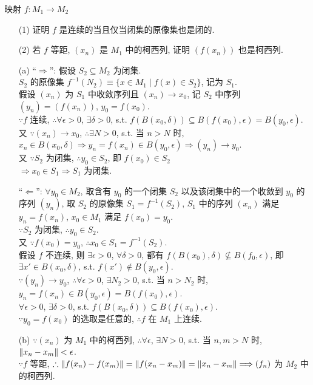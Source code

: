 \documentclass{assignment}
\begin{document}
\begin{prob}
    映射 $f:M_1\rightarrow M_2$
    \begin{itemize}
        \item[(1)] 证明 $f$ 是连续的当且仅当闭集的原像集也是闭的.
        \item[(2)] 若 $f$ 等距, $(x_n)$ 是 $M_1$ 中的柯西列, 证明 $(f(x_n))$ 也是柯西列.
    \end{itemize}
\end{prob}
\begin{sol}
    \begin{itemize}
        \item[(a)] ``$\Longrightarrow$'': 假设 $S_2\subseteq M_2$ 为闭集.\\
        $S_2$ 的原像集 $f^{-1}(N_2)\equiv\{x\in M_1\mid f(x)\in S_2\}$, 记为 $S_1$.\\
        假设 $(x_n)$ 为 $S_1$ 中收敛序列且 $(x_n)\rightarrow x_0$, 记 $S_2$ 中序列 $(y_n)=(f(x_n))$, $y_0=f(x_0)$.\\
        $\because f$ 连续, $\therefore\forall\epsilon>0$, $\exists\delta>0$, s.t. $f(B(x_0,\delta))\subseteq B(f(x_0),\epsilon)=B(y_0,\epsilon)$.\\
        又 $\because(x_n)\rightarrow x_0$, $\therefore\exists N>0$, s.t. 当 $n>N$ 时, $x_n\in B(x_0,\delta)\Longrightarrow y_n=f(x_n)\in B(y_0,\epsilon)\Longrightarrow(y_n)\rightarrow y_0$.\\
        又 $\because S_2$ 为闭集, $\therefore y_0\in S_2$, 即 $f(x_0)\in S_2$\\
        $\Longrightarrow x_0\in S_1\Longrightarrow S_1$ 为闭集.

        ``$\Longleftarrow$'': $\forall y_0\in M_2$, 取含有 $y_0$ 的一个闭集 $S_2$ 以及该闭集中的一个收敛到 $y_0$ 的序列 $(y_n)$, 取 $S_2$ 的原像集 $S_1=f^{-1}(S_2)$, $S_1$ 中的序列 $(x_n)$ 满足 $y_n=f(x_n)$, $x_0\in M_1$ 满足 $f(x_0)=y_0$.\\
        $\because S_2$ 为闭集, $\therefore y_0\in S_2$.\\
        又 $\because f(x_0)=y_0$, $\therefore x_0\in S_1=f^{-1}(S_2)$.\\

        假设 $f$ 不连续, 则 $\exists\epsilon>0$, $\forall\delta>0$, 都有 $f(B(x_0),\delta)\nsubseteq B(f_0,\epsilon)$, 即 $\exists x'\in B(x_0,\delta)$, s.t. $f(x')\notin B(y_0,\epsilon)$.\\
        $\because(y_n)\rightarrow y_0$, $\therefore\forall\epsilon>0$, $\exists N_2>0$, s.t. 当 $n>N_2$ 时, $y_n=f(x_n)\in B(y_0,\epsilon)=B(f(x_0),\epsilon)$.\\
        $\forall\epsilon>0$, $\exists\delta>0$, s.t. $f(B(x_0,\delta))\subseteq B(f(x_0),\epsilon)$.\\
        $\because y_0=f(x_0)$ 的选取是任意的, $\therefore f$ 在 $M_1$ 上连续.
        \item[(b)] $\because(x_n)$ 为 $M_1$ 中的柯西列, $\therefore\forall\epsilon$, $\exists N>0$, s.t. 当 $n,m>N$ 时, $\left\lVert x_n-x_m\right\rVert<\epsilon$.\\
        $\because f$ 等距, $\therefore\left\lVert f(x_n)-f(x_m)\right\rVert=\left\lVert f(x_n-x_m)\right\rVert=\left\lVert x_n-x_m\right\rVert\Longrightarrow(f_n)$ 为 $M_2$ 中的柯西列.
    \end{itemize}
\end{sol}
\end{document}

